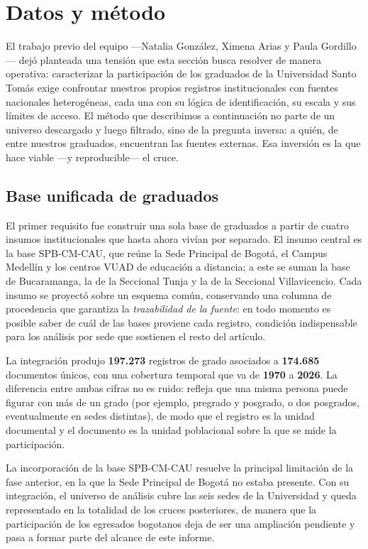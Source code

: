 \section{Datos y método}

El trabajo previo del equipo —Natalia González, Ximena Arias y Paula Gordillo— dejó planteada una tensión que esta sección busca resolver de manera operativa: caracterizar la participación de los graduados de la Universidad Santo Tomás exige confrontar nuestros propios registros institucionales con fuentes nacionales heterogéneas, cada una con su lógica de identificación, su escala y sus límites de acceso. El método que describimos a continuación no parte de un universo descargado y luego filtrado, sino de la pregunta inversa: a quién, de entre nuestros graduados, encuentran las fuentes externas. Esa inversión es la que hace viable —y reproducible— el cruce.

\subsection{Base unificada de graduados}

El primer requisito fue construir una sola base de graduados a partir de cuatro insumos institucionales que hasta ahora vivían por separado. El insumo central es la base SPB-CM-CAU, que reúne la Sede Principal de Bogotá, el Campus Medellín y los centros VUAD de educación a distancia; a este se suman la base de Bucaramanga, la de la Seccional Tunja y la de la Seccional Villavicencio. Cada insumo se proyectó sobre un esquema común, conservando una columna de procedencia que garantiza la \emph{trazabilidad de la fuente}: en todo momento es posible saber de cuál de las bases proviene cada registro, condición indispensable para los análisis por sede que sostienen el resto del artículo.

La integración produjo \textbf{197.273} registros de grado asociados a \textbf{174.685} documentos únicos, con una cobertura temporal que va de \textbf{1970} a \textbf{2026}. La diferencia entre ambas cifras no es ruido: refleja que una misma persona puede figurar con más de un grado (por ejemplo, pregrado y posgrado, o dos posgrados, eventualmente en sedes distintas), de modo que el registro es la unidad documental y el documento es la unidad poblacional sobre la que se mide la participación.

La incorporación de la base SPB-CM-CAU resuelve la principal limitación de la fase anterior, en la que la Sede Principal de Bogotá no estaba presente. Con su integración, el universo de análisis cubre las seis sedes de la Universidad y queda representado en la totalidad de los cruces posteriores, de manera que la participación de los egresados bogotanos deja de ser una ampliación pendiente y pasa a formar parte del alcance de este informe.

